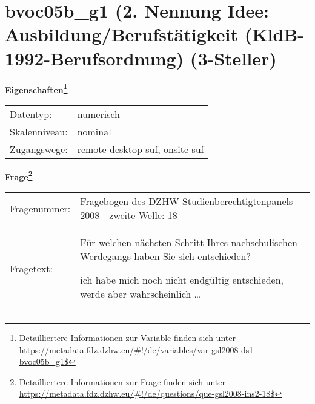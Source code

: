 
    \setcounter{footnote}{0}

    \vspace*{-1.8cm}
	\section{bvoc05b\_g1 (2. Nennung Idee: Ausbildung/Berufstätigkeit (KldB-1992-Berufsordnung) (3-Steller)}
	\label{section:bvoc05b_g1}



    \vspace*{0.5cm}
    \noindent\textbf{Eigenschaften\footnote{Detailliertere Informationen zur Variable finden sich unter
		\url{https://metadata.fdz.dzhw.eu/\#!/de/variables/var-gsl2008-ds1-bvoc05b_g1$}}}\\
	\begin{tabularx}{\hsize}{@{}lX}
	Datentyp: & numerisch \\
	Skalenniveau: & nominal \\
	Zugangswege: &
	  remote-desktop-suf, 
	  onsite-suf
 \\
    \end{tabularx}



				\vspace*{0.5cm}
                \noindent\textbf{Frage\footnote{Detailliertere Informationen zur Frage finden sich unter
		              \url{https://metadata.fdz.dzhw.eu/\#!/de/questions/que-gsl2008-ins2-18$}}}\\
				\begin{tabularx}{\hsize}{@{}lX}
					Fragenummer: &
					  Fragebogen des DZHW-Studienberechtigtenpanels 2008 - zweite Welle:
					  18
 \\
					Fragetext: & Für welchen nächsten Schritt Ihres nachschulischen Werdegangs haben Sie sich entschieden?\par  ich habe mich noch nicht endgültig entschieden, werde aber wahrscheinlich … \\
				\end{tabularx}





